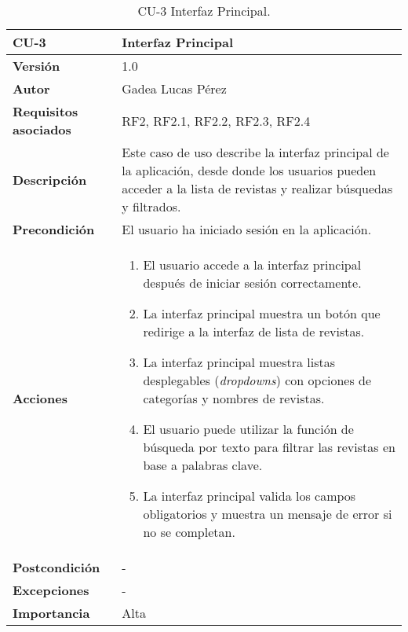 \begin{table}[p]
\centering
\begin{tabularx}{\linewidth}{ p{} p{} }
\toprule
\textbf{CU-3} & \textbf{Interfaz Principal}\\
\toprule
\textbf{Versión} & 1.0 \\
\textbf{Autor} & Gadea Lucas Pérez \\
\textbf{Requisitos asociados} & RF2, RF2.1, RF2.2, RF2.3, RF2.4 \\
\textbf{Descripción} & Este caso de uso describe la interfaz principal de la aplicación, desde donde los usuarios pueden acceder a la lista de revistas y realizar búsquedas y filtrados.\\
\textbf{Precondición} & El usuario ha iniciado sesión en la aplicación. \\
\textbf{Acciones} &
\begin{enumerate}
\def\labelenumi{\arabic{enumi}.}
\tightlist
\item El usuario accede a la interfaz principal después de iniciar sesión correctamente.
\item La interfaz principal muestra un botón que redirige a la interfaz de lista de revistas.
\item La interfaz principal muestra listas desplegables (\textit{dropdowns}) con opciones de categorías y nombres de revistas.
\item El usuario puede utilizar la función de búsqueda por texto para filtrar las revistas en base a palabras clave.
\item La interfaz principal valida los campos obligatorios y muestra un mensaje de error si no se completan.
\end{enumerate}\\
\textbf{Postcondición} & - \\
\textbf{Excepciones} & - \\
\textbf{Importancia} & Alta\\
\bottomrule
\end{tabularx}
\caption{CU-3 Interfaz Principal.}
\label{tab:cu3}
\end{table}

